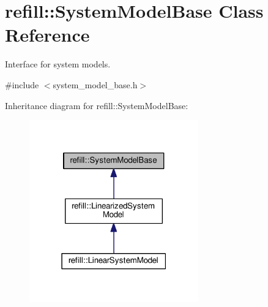 \hypertarget{classrefill_1_1SystemModelBase}{}\section{refill\+:\+:System\+Model\+Base Class Reference}
\label{classrefill_1_1SystemModelBase}


Interface for system models.  




{\ttfamily \#include $<$system\+\_\+model\+\_\+base.\+h$>$}



Inheritance diagram for refill\+:\+:System\+Model\+Base\+:\nopagebreak
\begin{figure}[H]
\begin{center}
\leavevmode
\includegraphics[width=207pt]{classrefill_1_1SystemModelBase__inherit__graph}
\end{center}
\end{figure}
